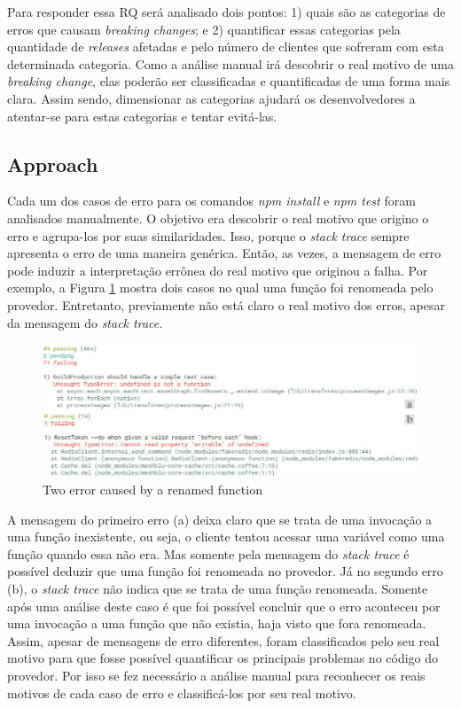 Para responder essa RQ será analisado dois pontos: 1) quais são as categorias de erros que causam \textit{breaking changes}; e 2) quantificar essas categorias pela quantidade de \textit{releases} afetadas e pelo número de clientes que sofreram com esta determinada categoria. Como a análise manual irá descobrir o real motivo de uma \textit{breaking change}, elas poderão ser classificadas e quantificadas de uma forma mais clara. Assim sendo, dimensionar as categorias ajudará os desenvolvedores a atentar-se para estas categorias e tentar evitá-las.

\subsection{Approach}
\label{apr:rq2}

Cada um dos casos de erro para os comandos \textit{npm install} e \textit{npm test} foram analisados manualmente. O objetivo era descobrir o real motivo que origino o erro e agrupa-los por suas similaridades. Isso, porque o \textit{stack trace} sempre apresenta o erro de uma maneira genérica. Então, as vezes, a mensagem de erro pode induzir a interpretação errônea do real motivo que originou a falha. Por exemplo, a Figura \ref{fig:error_category} mostra dois casos no qual uma função foi renomeada pelo provedor. Entretanto, previamente não está claro o real motivo dos erros, apesar da mensagem do \textit{stack trace}.

\begin{figure}[!h]
    \centering
    \includegraphics[scale=0.5]{figuras/error_category.jpeg}
    \caption{Two error caused by a renamed function}
    \label{fig:error_category}
\end{figure}

A mensagem do primeiro erro (a) deixa claro que se trata de uma invocação a uma função inexistente, ou seja, o cliente tentou acessar uma variável como uma função quando essa não era. Mas somente pela mensagem do \textit{stack trace} é possível deduzir que uma função foi renomeada no provedor. Já no segundo erro (b), o \textit{stack trace} não indica que se trata de uma função renomeada. Somente após uma análise deste caso é que foi possível concluir que o erro aconteceu por uma invocação a uma função que não existia, haja visto que fora renomeada. Assim, apesar de mensagens de erro diferentes, foram classificados pelo seu real motivo para que fosse possível quantificar os principais problemas no código do provedor. Por isso se fez necessário a análise manual para reconhecer os reais motivos de cada caso de erro e classificá-los por seu real motivo.

